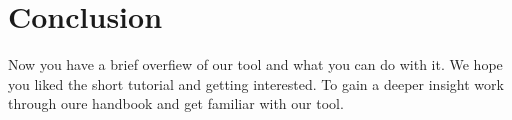 





\section{Conclusion}
Now you have a brief overfiew of our tool and what you can do with it. We hope you liked the short tutorial and getting interested. To gain a deeper insight work through oure handbook and get familiar with our tool.


